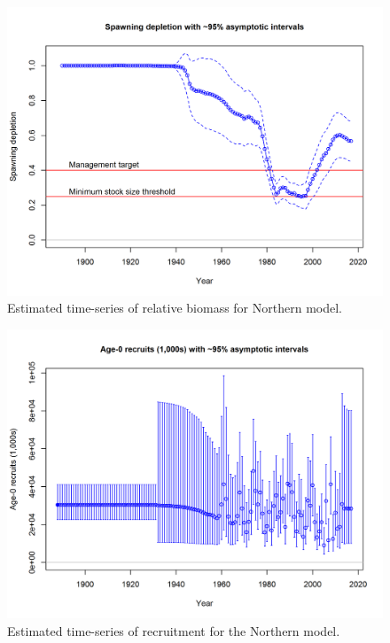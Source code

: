 \documentclass[12pt,]{article}
\begin{document}
\FloatBarrier

\begin{figure}[htbp]
\centering
\includegraphics{r4ss/plots_mod1/ts9_Spawning_depletion_with_95_asymptotic_intervals_intervals.png}
\caption{Estimated time-series of relative biomass for Northern model.
\label{fig:depl}}
\end{figure}

\FloatBarrier

\begin{figure}[htbp]
\centering
\includegraphics{r4ss/plots_mod1/ts11_Age-0_recruits_(1000s)_with_95_asymptotic_intervals.png}
\caption{Estimated time-series of recruitment for the Northern model.
\label{fig:recruits1}}
\end{figure}
\end{document}
